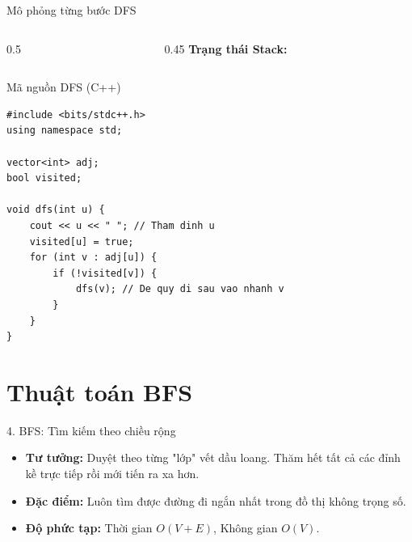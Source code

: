 \documentclass[aspectratio=169]{beamer}
\begin{document}
\begin{frame}{Mô phỏng từng bước DFS}
\begin{columns}
\begin{column}{0.5\textwidth}
        \end{column}
        \begin{column}{0.45\textwidth}
            \textbf{Trạng thái Stack:}\\
            \vspace{0.2cm} \small
        \end{column}
    \end{columns}
\end{frame}

\begin{frame}[fragile]{Mã nguồn DFS (C++)}
\begin{verbatim}
#include <bits/stdc++.h>
using namespace std;

vector<int> adj;
bool visited;

void dfs(int u) {
    cout << u << " "; // Tham dinh u
    visited[u] = true;
    for (int v : adj[u]) {
        if (!visited[v]) {
            dfs(v); // De quy di sau vao nhanh v
        }
    }
}
\end{verbatim}
\end{frame}

\section{Thuật toán BFS}
\begin{frame}{4. BFS: Tìm kiếm theo chiều rộng}
    \begin{itemize}
        \item \textbf{Tư tưởng:} Duyệt theo từng "lớp" vết dầu loang. Thăm hết tất cả các đỉnh kề trực tiếp rồi mới tiến ra xa hơn.
        \item \textbf{Đặc điểm:} Luôn tìm được đường đi ngắn nhất trong đồ thị không trọng số.
        \item \textbf{Độ phức tạp:} Thời gian $O(V + E)$, Không gian $O(V)$.
    \end{itemize}
\end{frame}
\end{document}
